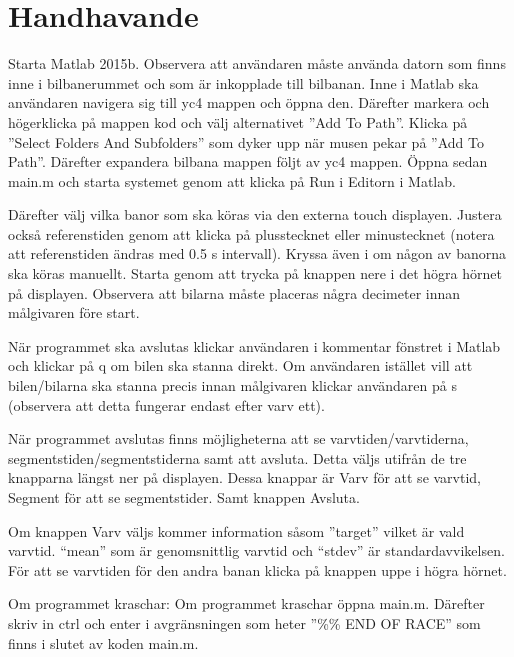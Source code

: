 \section{Handhavande}
\label{app:handhavande}
Starta Matlab 2015b. Observera att användaren måste använda datorn som finns
inne i bilbanerummet och som är inkopplade till bilbanan. Inne i Matlab ska användaren navigera sig till yc4 mappen och öppna den. Därefter markera och högerklicka på mappen kod och välj alternativet ''Add To Path''. Klicka på ''Select Folders And Subfolders'' som dyker upp när musen pekar på ''Add To Path''. Därefter expandera bilbana mappen följt av yc4 mappen. Öppna sedan main.m och starta systemet genom att klicka på Run i Editorn i Matlab.

Därefter välj vilka banor som ska köras via den externa touch displayen. Justera också referenstiden genom att klicka på plusstecknet eller minustecknet (notera att referenstiden ändras med 0.5 s intervall). Kryssa även i om någon av banorna ska köras manuellt. Starta genom att trycka på knappen nere i det högra hörnet på displayen. Observera att bilarna måste placeras några decimeter innan målgivaren före start.

När programmet ska avslutas klickar användaren i kommentar fönstret i Matlab och
klickar på q om bilen ska stanna direkt. Om användaren istället vill att
bilen/bilarna ska stanna precis innan målgivaren klickar användaren på s
(observera att detta fungerar endast efter varv ett).

När programmet avslutas finns möjligheterna att se varvtiden/varvtiderna,
segmentstiden/segmentstiderna samt att avsluta. Detta väljs utifrån de tre
knapparna längst ner på displayen. Dessa knappar är Varv för att se varvtid,
Segment för att se segmentstider. Samt knappen Avsluta.

Om knappen Varv väljs kommer information såsom ''target'' vilket är vald varvtid.
“mean” som är genomsnittlig varvtid och “stdev” är standardavvikelsen. För att
se varvtiden för den andra banan klicka på knappen uppe i högra hörnet.

Om programmet kraschar: Om programmet kraschar öppna main.m. Därefter skriv in
ctrl och enter i avgränsningen som heter ''\%\% END OF RACE'' som finns i slutet av
koden main.m.

